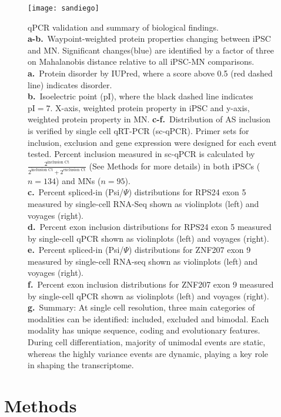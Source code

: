 \begin{figure}[h] 
  \centering
  \texttt{[image: sandiego]}
  \caption[qPCR validation and summary of biological findings.]{qPCR validation and summary of biological findings.\\
\textbf{a-b.}~Waypoint-weighted protein properties changing between iPSC and MN. Significant changes(blue) are identified by a factor of three on Mahalanobis distance relative to all iPSC-MN comparisons.\\
\textbf{a.}~Protein disorder by IUPred, where a score above 0.5 (red dashed line) indicates disorder.\\
\textbf{b.}~Isoelectric point (pI), where the black dashed line indicates $\text{pI}=7$. X-axis, weighted protein property in iPSC and y-axis, weighted protein property in MN. 
\textbf{c-f.}~Distribution of AS inclusion is verified by single cell qRT-PCR (sc-qPCR). Primer sets for inclusion, exclusion and gene expression were designed for each event tested. Percent inclusion measured in sc-qPCR is calculated by $\frac{2^{\text{inclusion Ct}}}{2^{\text{inclusion Ct}} + 2^{\text{exclusion Ct}}}$ (See Methods for more details) in both iPSCs ($n =134$) and MNs ($n = 95$). \\
\textbf{c.}~Percent spliced-in (Psi/$\Psi$) distributions for RPS24 exon 5 measured by single-cell RNA-Seq shown as violinplots (left) and voyages (right).\\
\textbf{d.}~Percent exon inclusion distributions for RPS24 exon 5 measured by single-cell qPCR shown as violinplots (left) and voyages (right).\\
\textbf{e.}~Percent spliced-in (Psi/$\Psi$) distributions for ZNF207 exon 9 measured by single-cell RNA-seq shown as violinplots (left) and voyages (right).\\
\textbf{f.}~Percent exon inclusion distributions for ZNF207 exon 9 measured by single-cell qPCR shown as violinplots (left) and voyages (right).\\
\textbf{g.}~Summary: At single cell resolution, three main categories of modalities can be identified: included, excluded and bimodal. Each modality has unique sequence, coding and evolutionary features. During cell differentiation, majority of unimodal events are static, whereas the highly variance events are dynamic, playing a key role in shaping the transcriptome.
}
  \label{fig:validation_summary}
\end{figure}


\section{Methods}

